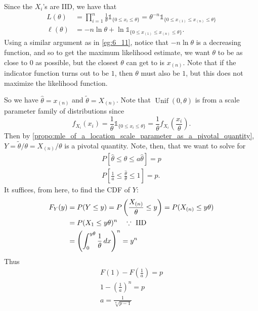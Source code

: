 \documentclass[notoc,notitlepage]{tufte-book}
\DeclareMathOperator{\Unif}{Unif }
\begin{document}
\begin{solution}
  Since the $X_i$'s are IID, we have that
  \begin{align*}
    L(\theta) &= \prod_{i=1}^{n} \frac{1}{\theta} \mathbb{1}_{\{0 \leq x_i \leq \theta\}} = \theta^{-n} \mathbb{1}_{\{0 \leq x_{(1)} \leq x_{(n)} \leq \theta\}} \\
    \ell(\theta) &= - n \ln \theta + \ln \mathbb{1}_{\{0 \leq x_{(1)} \leq x_{(n)} \leq \theta\}}.
  \end{align*}
  Using a similar argument as in \cref{eg:6_11}, notice that $-n \ln \theta$ is a decreasing function, and so to get the maximum likelihood estimate, we want $\theta$ to be as close to $0$ as possible, but the closest $\theta$ can get to is $x_{(n)}$. Note that if the indicator function turns out to be $1$, then $\theta$ must also be $1$, but this does not maximize the likelihood function.

  So we have $\hat{\theta} = x_{(n)}$ and $\tilde{\theta} = X_{(n)}$. Note that $\Unif(0, \theta)$ is from a scale parameter family of distributions since
  \begin{equation*}
    f_{X_i}(x_i) = \frac{1}{\theta} \mathbb{1}_{\{0 \leq x_i \leq \theta\}} = \frac{1}{\theta} f_{X_i}\left(\frac{x_i}{\theta}\right).
  \end{equation*}
  Then by \cref{propo:mle_of_a_location_scale_parameter_as_a_pivotal_quantity}, $Y = \tilde{\theta} / \theta = X_{(n)} / \theta$ is a pivotal quantity. Note, then, that we want to solve for
  \begin{gather*}
    P\left[ \hat{\theta} \leq \theta \leq a \hat{\theta} \right] = p \\
    P\left[ \frac{1}{a} \leq \frac{\hat{\theta}}{\theta} \leq 1 \right] = p.
  \end{gather*}
  It suffices, from here, to find the CDF of $Y$:
  \begin{align*}
    F_Y(y) &= P(Y \leq y) = P\left( \frac{X_{(n)}}{\theta} \leq y \right) = P(X_{(n)} \leq y \theta) \\
           &= P(X_1 \leq y \theta)^n \quad \because \text{ IID } \\
           &= \left( \int_{0}^{y \theta} \frac{1}{\theta} \mathop{}\!d{x} \right)^n = y^n
  \end{align*}
  Thus
  \begin{gather*}
    F(1) - F\left(\frac{1}{a}\right) = p \\
    1 - \left( \frac{1}{a} \right)^n = p \\
    a = \frac{1}{\sqrt[n]{p - 1}}
  \end{gather*}
\end{solution}
\end{document}
